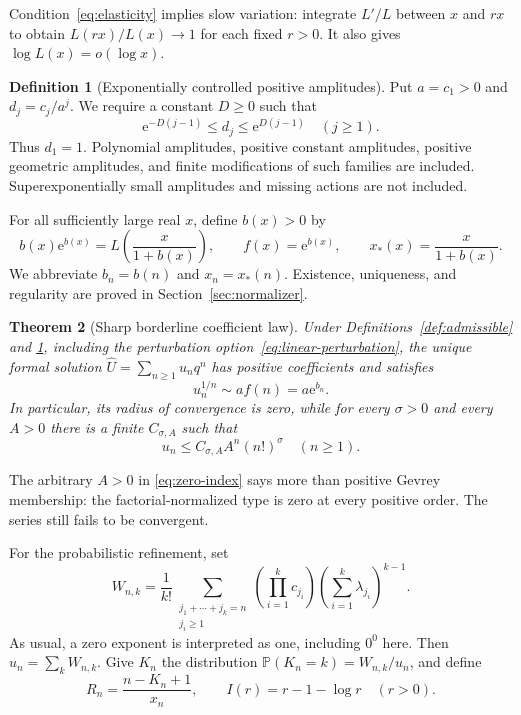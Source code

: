 \documentclass[11pt,a4paper]{article}
\numberwithin{equation}{section}
\newtheorem{theorem}{Theorem}[section]
\theoremstyle{definition}
\newtheorem{definition}[theorem]{Definition}
\theoremstyle{remark}
\newcommand{\Uhat}{\widehat U}
\newcommand{\Prob}{\mathbb P}
\newcommand{\ee}{\mathrm e}
\begin{document}
Condition~\eqref{eq:elasticity} implies slow variation: integrate
$L'/L$ between $x$ and $rx$ to obtain $L(rx)/L(x)\to1$ for each fixed
$r>0$. It also gives $\log L(x)=o(\log x)$.

\begin{definition}[Exponentially controlled positive amplitudes]
\label{def:amplitudes}
Put $a=c_1>0$ and $d_j=c_j/a^j$. We require a constant $D\ge0$ such that
\begin{equation}
 \ee^{-D(j-1)}\le d_j\le\ee^{D(j-1)}\quad(j\ge1).
 \label{eq:amplitudes}
\end{equation}
Thus $d_1=1$. Polynomial amplitudes, positive constant amplitudes,
positive geometric amplitudes, and finite modifications of such families
are included. Superexponentially small amplitudes and missing actions are
not included.
\end{definition}

For all sufficiently large real $x$, define $b(x)>0$ by
\begin{equation}
 b(x)\ee^{b(x)}=L\!\left(\frac{x}{1+b(x)}\right),\qquad
 f(x)=\ee^{b(x)},\qquad x_*(x)=\frac{x}{1+b(x)}.
 \label{eq:b-definition}
\end{equation}
We abbreviate $b_n=b(n)$ and $x_n=x_*(n)$. Existence, uniqueness, and
regularity are proved in Section~\ref{sec:normalizer}.

\begin{theorem}[Sharp borderline coefficient law]
\label{thm:main}
Under Definitions~\ref{def:admissible} and \ref{def:amplitudes}, including
the perturbation option~\eqref{eq:linear-perturbation}, the unique formal
solution $\Uhat=\sum_{n\ge1}u_nq^n$ has positive coefficients and satisfies
\begin{equation}
 \boxed{\quad u_n^{1/n}\sim a f(n)=a\ee^{b_n}.\quad}
 \label{eq:root-law}
\end{equation}
In particular, its radius of convergence is zero, while for every
$\sigma>0$ and every $A>0$ there is a finite $C_{\sigma,A}$ such that
\begin{equation}
 u_n\le C_{\sigma,A} A^n(n!)^\sigma\quad(n\ge1).
 \label{eq:zero-index}
\end{equation}
\end{theorem}

The arbitrary $A>0$ in \eqref{eq:zero-index} says more than positive
Gevrey membership: the factorial-normalized type is zero at every
positive order. The series still fails to be convergent.

For the probabilistic refinement, set
\begin{equation}
 W_{n,k}=\frac1{k!}
 \sum_{\substack{j_1+\cdots+j_k=n\\j_i\ge1}}
 \left(\prod_{i=1}^k c_{j_i}\right)
 \left(\sum_{i=1}^k\lambda_{j_i}\right)^{k-1}.
 \label{eq:Wnk}
\end{equation}
As usual, a zero exponent is interpreted as one, including $0^0$ here.
Then $u_n=\sum_kW_{n,k}$. Give $K_n$ the distribution
$\Prob(K_n=k)=W_{n,k}/u_n$, and define
\begin{equation}
 R_n=\frac{n-K_n+1}{x_n},\qquad I(r)=r-1-\log r\quad(r>0).
 \label{eq:Rn}
\end{equation}
\end{document}

